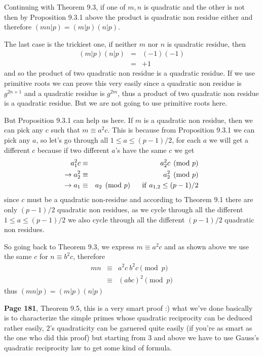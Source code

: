 \documentclass[aps,preprint,preprintnumbers,nofootinbib,showpacs,prd]{revtex4-1}
\newcommand{\nbea}{\begin{eqnarray*}}
\newcommand{\neea}{\end{eqnarray*}}
\begin{document}
Continuing with Theorem 9.3, if one of $m,n$ is quadratic and the other is not then by Proposition 9.3.1 above the product is quadratic non residue either and therefore $(mn|p) = (m|p)(n|p)$.

The last case is the trickiest one, if neither $m$ nor $n$ is quadratic residue, then
%
\nbea
(m|p)(n|p) & = & (-1)(-1) \\
& = & +1
\neea
%
and so the product of two quadratic non residue is a quadratic residue. If we use primitive roots we can prove this very easily since a quadratic non residue is $g^{2n+1}$ and a quadratic residue is $g^{2m}$, thus a product of two quadratic non residue is a quadratic residue. But we are not going to use primitive roots here.

But Proposition 9.3.1 can help us here. If $m$ is a quadratic non residue, then we can pick any $c$ such that $m \equiv a^2 c$. This is because from Proposition 9.3.1 we can pick any $a$, so let's go through all $1 \le a \le (p-1)/2$, for each $a$ we will get a different $c$ because if two different $a$'s have the same $c$ we get
%
\nbea
a^2_1 c & \equiv & a^2_2 c \pmod{p} \\
\to a^2_2 & \equiv & a^2_2 \pmod{p} \\
\to a_1 & \equiv & a_2 \pmod{p} ~~~~~{\rm if}~ a_{1,2} \le (p-1)/2
\neea
%
since $c$ must be a quadratic non-residue and according to Theorem 9.1 there are only $(p-1)/2$ quadratic non residues, as we cycle through all the different $1 \le a \le (p-1)/2$ we also cycle through all the different $(p-1)/2$ quadratic non residues.

So going back to Theorem 9.3, we express $m \equiv a^2 c$ and as shown above we use the same $c$ for $n \equiv b^2 c$, therefore
%
\nbea
mn & \equiv & a^2 c~ b^2 c \pmod{p} \\
& \equiv & (abc)^2 \pmod{p}
\neea
%
thus $(mn|p) = (m|p)(n|p)$

{\bf Page 181}, Theorem 9.5, this is a very smart proof :) what we've done basically is to characterize the simple primes whose quadratic reciprocity can be deduced rather easily, $2$'s quadraticity can be garnered quite easily (if you're as smart as the one who did this proof) but starting from 3 and above we have to use Gauss's quadratic reciprocity law to get some kind of formula.
\end{document}
